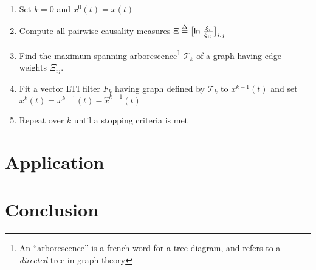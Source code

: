\documentclass[12pt]{article}
\begin{document}

\begin{enumerate}
  \item{Set $k = 0$ and $x^0(t) = x(t)$}
  \item{Compute all pairwise causality measures $\Xi \overset{\Delta}{=} \big[\mathsf{ln\ } \frac{\xi_i}{\xi_{ij}} \big]_{i, j}$}
  \item{Find the maximum spanning arborescence\footnote{An ``arborescence'' is a french word for a tree diagram, and refers to a \textit{directed} tree in graph theory} $\mathcal{T}_k$ of a graph having edge weights $\Xi_{ij}$.}
  \item{Fit a vector LTI filter $F_k$ having graph defined by $\mathcal{T}_k$ to $x^{k - 1}(t)$ and set $x^k(t) = x^{k - 1}(t) - \hat{x}^{k - 1}(t)$}
  \item{Repeat over $k$ until a stopping criteria is met}
\end{enumerate}


\section{Application}
\section{Conclusion}

\printbibliography
\end{document}
